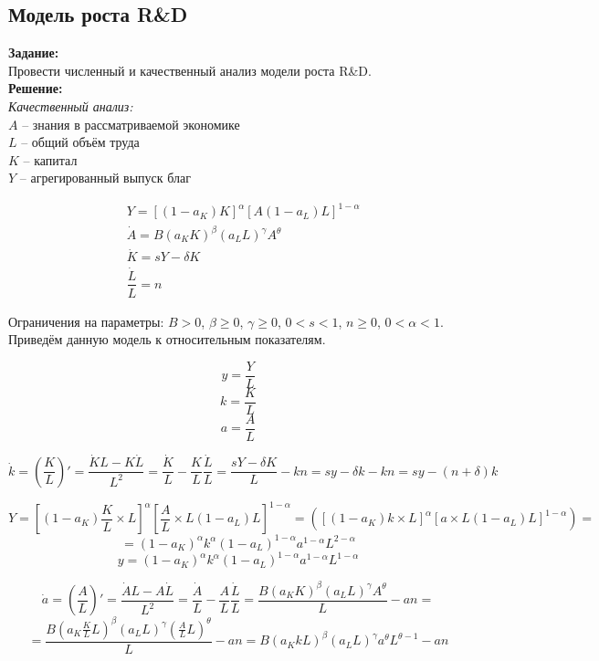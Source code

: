 \subsection*{Модель роста R\&D}

\textbf{Задание:}\\
Провести численный и качественный анализ модели роста R\&D.\\

\textbf{Решение:}\\
\textit{Качественный анализ:}\\
$A$ -- знания в рассматриваемой экономике\\
$L$ -- общий объём труда\\
$K$ -- капитал\\
$Y$ -- агрегированный выпуск благ

\begin{align*}
& Y = [(1 - a_K)K]^\alpha [A (1 - a_L)L]^{1-\alpha}\\
& \dot{A} = B(a_K K)^\beta (a_L L)^\gamma A^\theta\\
& \dot{K} = sY - \delta K\\
& \dfrac{\dot{L}}{L} = n
\end{align*}

Ограничения на параметры: $B > 0$, $\beta \geq 0$, $\gamma \geq 0$, $0 < s < 1$, $n \geq 0$, $0 < \alpha < 1$.\\

Приведём данную модель к относительным показателям.

\[y = \dfrac{Y}{L} \]
\[k = \dfrac{K}{L} \]
\[a = \dfrac{A}{L} \]

\[\dot{k} = \left(\dfrac{K}{L}\right)' = \dfrac{\dot{K}L - K\dot{L}}{L^2} = \dfrac{\dot{K}}{L} - \dfrac{K}{L} \dfrac{\dot{L}}{L} = \dfrac{sY - \delta K}{L} - kn = sy - \delta k - kn = sy - (n + \delta)k \]

\[Y = \left[(1 - a_K) \dfrac{K}{L} \times L \right]^\alpha \left[\dfrac{A}{L} \times L (1 - a_L) L \right]^{1 - \alpha} = ([(1 - a_K) k \times L]^\alpha [a \times L(1 - a_L)L]^{1-\alpha}) = \]
\[ = (1 - a_K)^\alpha k^\alpha (1 - a_L)^{1-\alpha} a^{1-\alpha} L^{2 - \alpha} \]
\[y = (1 - a_K)^\alpha k^\alpha (1 - a_L)^{1 - \alpha} a^{1 - \alpha} L^{1 - \alpha} \]

\newpage

\[\dot{a} = \left(\dfrac{A}{L}\right)' = \dfrac{\dot{A}L - A\dot{L}}{L^2} = \dfrac{\dot{A}}{L} - \dfrac{A}{L} \dfrac{\dot{L}}{L} = \dfrac{B(a_K K)^\beta (a_L L)^\gamma A^\theta}{L} - an = \]
\[ = \dfrac{B(a_K \frac{K}{L}L)^\beta (a_L L)^\gamma (\frac{A}{L} L)^\theta}{L} - an = B(a_K k L)^\beta (a_L L)^\gamma a^\theta L^{\theta - 1} - an \]

